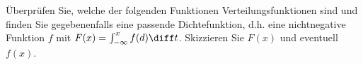 \documentclass{abgabe}
\begin{document}
\begin{questions}
    \question
    Überprüfen Sie, welche der folgenden Funktionen Verteilungsfunktionen sind und finden Sie gegebenenfalls eine passende Dichtefunktion, d.h. eine nichtnegative Funktion $f$ mit 
    $F(x) = \int^x_{-\infty} f(d) \diff t$. 
    Skizzieren Sie $F(x)$ und eventuell $f(x)$. 
    
    
\end{questions}
\end{document}
